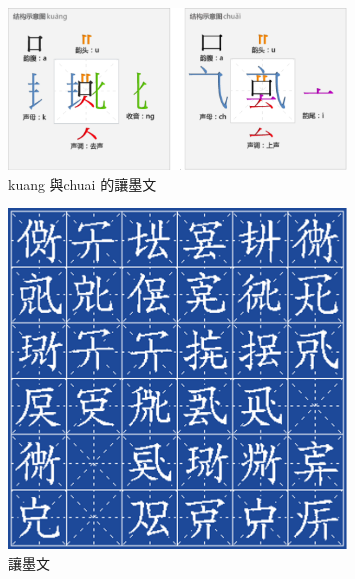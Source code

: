 \documentclass[a5paper, 12pt, openany]{book} %
\begin{document}
\begin{figure}[H]
  \centering
  \includegraphics[width=0.8\textwidth]{./images/rangmowen_3.png}
  \caption{kuang 與chuai 的讓墨文}
  \label{fig:rangmowen_3}
\end{figure}


\begin{figure}[H]
  \centering
  \includegraphics[width=0.8\textwidth]{./images/rangmowen_4.png}
  \caption{讓墨文}
  \label{fig:rangmowen_4}
\end{figure}
\end{document}
